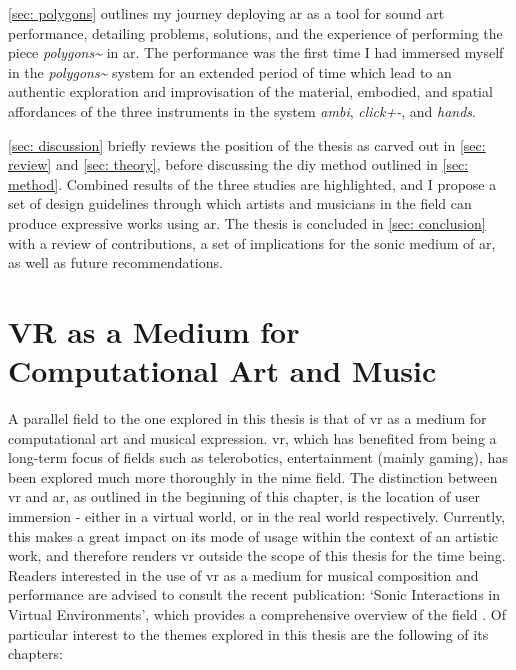 \autoref{sec: polygons} outlines my journey deploying \gls{ar} as a tool for sound \gls{art} performance, detailing problems, solutions, and the experience of performing the piece \textit{polygons\textasciitilde{}} in \gls{ar}. The performance was the first time I had immersed myself in the \textit{polygons\textasciitilde{}} system for an extended period of time which lead to an authentic exploration and improvisation of the material, embodied, and spatial affordances of the three instruments in the system \textit{ambi}, \textit{click+-}, and \textit{hands}.

\autoref{sec: discussion} briefly reviews the position of the thesis as carved out in \autoref{sec: review} and \autoref{sec: theory}, before discussing the \gls{diy} method outlined in \autoref{sec: method}. Combined results of the three studies are highlighted, and I propose a set of design guidelines through which artists and musicians in the field can produce expressive works using \gls{ar}. The thesis is concluded in \autoref{sec: conclusion} with a review of contributions, a set of implications for the sonic medium of \gls{ar}, as well as future recommendations.

\section{VR as a Medium for Computational Art and Music}
A parallel field to the one explored in this thesis is that of \gls{vr} as a medium for computational art and musical expression. \gls{vr}, which has benefited from being a long-term focus of fields such as telerobotics, entertainment (mainly gaming), has been explored much more thoroughly in the \gls{nime} field. The distinction between \gls{vr} and \gls{ar}, as outlined in the beginning of this chapter, is the location of user immersion - either in a virtual world, or in the real world respectively. Currently, this makes a great impact on its mode of usage within the context of an artistic work, and therefore renders \gls{vr} outside the scope of this thesis for the time being. Readers interested in the use of \gls{vr} as a medium for musical composition and performance are advised to consult the recent publication: `Sonic Interactions in Virtual Environments', which provides a comprehensive overview of the field \citep{geronazzo2023}. Of particular interest to the themes explored in this thesis are the following of its chapters: 

